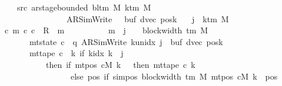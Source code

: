 \begin{isabellebody}
\ \ \ \ \ \ \ src{}{\isacharcolon}{\kern0pt}\ {\isachardoublequoteopen}ar{\isacharunderscore}{\kern0pt}stage{\isacharunderscore}{\kern0pt}bounded\ {\isacharparenleft}{\kern0pt}bl{\isacharunderscore}{\kern0pt}tm\ M{\isacharparenright}{\kern0pt}\ {\isacharparenleft}{\kern0pt}k{\isacharunderscore}{\kern0pt}tm\ M{\isacharparenright}{\kern0pt}\isanewline
\ \ \ \ \ \ \ \ \ \ \ \ \ \ \ \ \ \ \ {\isacharparenleft}{\kern0pt}AR{\isacharunderscore}{\kern0pt}SimWrite{\isacharcomma}{\kern0pt}\ {}{\isacharcomma}{\kern0pt}\ {}{\isacharcomma}{\kern0pt}\ buf{\isacharcomma}{\kern0pt}\ dvec{\isacharcomma}{\kern0pt}\ posk{\isacharparenright}{\kern0pt}{\isachardoublequoteclose}\isanewline
\ \ \ {\isachardoublequoteopen}j\ {\isasymle}\ k{\isacharunderscore}{\kern0pt}tm\ M\ {\isacharminus}{\kern0pt}\ {}\ {\isasymLongrightarrow}\isanewline
\ \ \ \ {\isacharparenleft}{\kern0pt}{\isasymexists}c\ m{\isachardot}{\kern0pt}\ {\isacharparenleft}{\kern0pt}c{}{\isacharcomma}{\kern0pt}\ c{\isacharparenright}{\kern0pt}\ {\isasymin}\ R{\isacharprime}{\kern0pt}\ {\isacharcircum}{\kern0pt}{\isacharcircum}{\kern0pt}\ m\isanewline
\ \ \ \ \ \ \ \ \ {\isasymand}\ m\ {\isasymle}\ j\ {\isacharasterisk}{\kern0pt}\ {\isacharparenleft}{\kern0pt}{}\ {\isacharasterisk}{\kern0pt}\ block{\isacharunderscore}{\kern0pt}width\ {\isacharparenleft}{\kern0pt}{\isasymGamma}{\isacharunderscore}{\kern0pt}tm\ M{\isacharparenright}{\kern0pt}{\isacharparenright}{\kern0pt}\isanewline
\ \ \ \ \ \ \ \ \ {\isasymand}\ mt{\isacharunderscore}{\kern0pt}state\ c\ {\isacharequal}{\kern0pt}\ {\isacharparenleft}{\kern0pt}q{\isacharcomma}{\kern0pt}\ AR{\isacharunderscore}{\kern0pt}SimWrite{\isacharcomma}{\kern0pt}\ k{\isacharunderscore}{\kern0pt}unidx\ j{\isacharcomma}{\kern0pt}\ {}{\isacharcomma}{\kern0pt}\ buf{\isacharcomma}{\kern0pt}\ dvec{\isacharcomma}{\kern0pt}\ posk{\isacharparenright}{\kern0pt}\isanewline
\ \ \ \ \ \ \ \ \ {\isasymand}\ mt{\isacharunderscore}{\kern0pt}tape\ c\ {\isacharequal}{\kern0pt}\ {\isacharparenleft}{\kern0pt}{\isasymlambda}k{\isachardot}{\kern0pt}\ if\ k{\isacharunderscore}{\kern0pt}idx\ k\ {\isacharless}{\kern0pt}\ j\isanewline
\ \ \ \ \ \ \ \ \ \ \ \ \ \ then\ {\isacharparenleft}{\kern0pt}if\ mt{\isacharunderscore}{\kern0pt}pos\ cM\ k\ {\isacharequal}{\kern0pt}\ {}\ then\ mt{\isacharunderscore}{\kern0pt}tape\ c{}\ k\isanewline
\ \ \ \ \ \ \ \ \ \ \ \ \ \ \ \ \ \ \ \ else\ {\isacharparenleft}{\kern0pt}{\isasymlambda}pos{\isachardot}{\kern0pt}\ if\ sim{\isacharunderscore}{\kern0pt}pos\ {\isacharparenleft}{\kern0pt}block{\isacharunderscore}{\kern0pt}width\ {\isacharparenleft}{\kern0pt}{\isasymGamma}{\isacharunderscore}{\kern0pt}tm\ M{\isacharparenright}{\kern0pt}{\isacharparenright}{\kern0pt}\ {\isacharparenleft}{\kern0pt}mt{\isacharunderscore}{\kern0pt}pos\ cM\ k{\isacharparenright}{\kern0pt}\ {\isasymle}\ pos\isanewline

\end{isabellebody}
